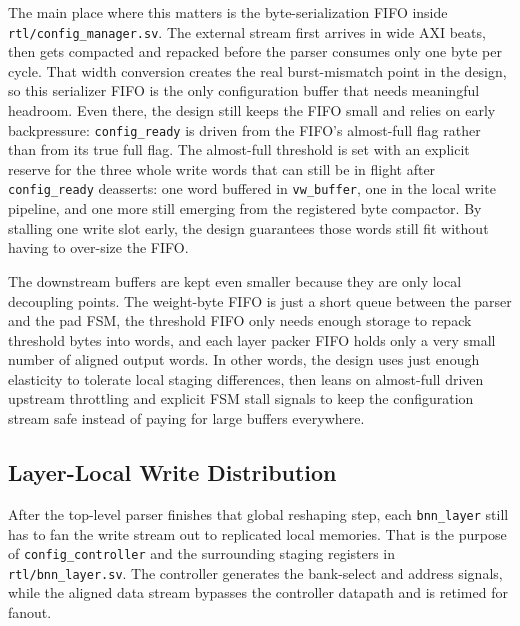 The main place where this matters is the byte-serialization FIFO inside
\texttt{rtl/config\_manager.sv}. The external stream first arrives in wide AXI
beats, then gets compacted and repacked before the parser consumes only one
byte per cycle. That width conversion creates the real burst-mismatch point in
the design, so this serializer FIFO is the only configuration buffer that
needs meaningful headroom. Even there, the design still keeps the FIFO small
and relies on early backpressure: \texttt{config\_ready} is driven from the
FIFO's almost-full flag rather than from its true full flag. The almost-full
threshold is set with an explicit reserve for the three whole write words that
can still be in flight after \texttt{config\_ready} deasserts: one word
buffered in \texttt{vw\_buffer}, one in the local write pipeline, and one more
still emerging from the registered byte compactor. By stalling one write slot
early, the design guarantees those words still fit without having to over-size
the FIFO.

The downstream buffers are kept even smaller because they are only local
decoupling points. The weight-byte FIFO is just a short queue between the
parser and the pad FSM, the threshold FIFO only needs enough storage to repack
threshold bytes into words, and each layer packer FIFO holds only a very small
number of aligned output words. In other words, the design uses just enough
elasticity to tolerate local staging differences, then leans on almost-full
driven upstream throttling and explicit FSM stall signals to keep the
configuration stream safe instead of paying for large buffers everywhere.

\clearpage
\begin{strip}
  \centering
  \resizebox{!}{0.73\textheight}{}
  \label{fig:config-manager}
\end{strip}

\subsection{Layer-Local Write Distribution}

After the top-level parser finishes that global reshaping step, each
\texttt{bnn\_layer} still has to fan the write stream out to replicated local
memories. That is the purpose of \texttt{config\_controller} and the
surrounding staging registers in \texttt{rtl/bnn\_layer.sv}. The controller
generates the bank-select and address signals, while the aligned data stream
bypasses the controller datapath and is retimed for fanout.

